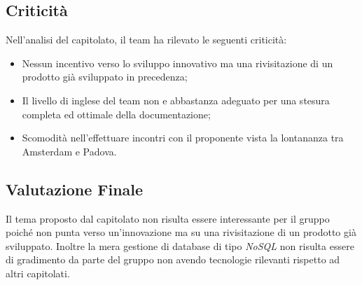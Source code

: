 \subsection{Criticità}
Nell'analisi del capitolato, il team ha rilevato le seguenti criticità:
\begin{itemize}
	\item Nessun incentivo verso lo sviluppo innovativo ma una rivisitazione di un prodotto già sviluppato in precedenza; 
	\item Il livello di inglese del team non e abbastanza adeguato per una stesura completa ed ottimale della documentazione; 	
	\item Scomodità nell'effettuare incontri con il proponente vista la lontananza tra Amsterdam e Padova.
\end{itemize}

\subsection{Valutazione Finale}
Il tema proposto dal capitolato non risulta essere interessante per il gruppo poiché non punta verso un'innovazione ma su una rivisitazione di un prodotto già sviluppato.
Inoltre la mera gestione di database di tipo \textit{NoSQL} non risulta essere di gradimento da parte del gruppo non avendo tecnologie rilevanti rispetto ad altri capitolati. 

